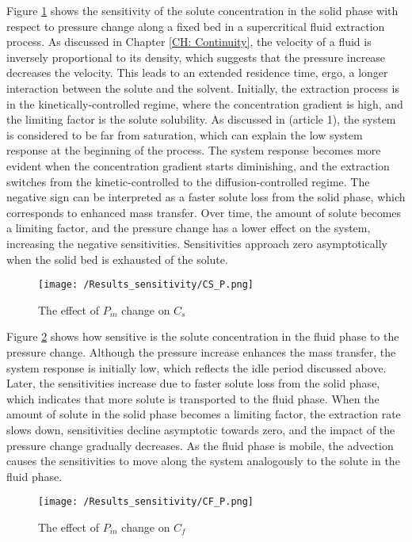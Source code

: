 \documentclass[../Article_Sensitivity_Analsysis.tex]{subfiles}
\begin{document}
	Figure \ref{fig:Sensitivty_P_CS} shows the sensitivity of the solute concentration in the solid phase with respect to pressure change along a fixed bed in a supercritical fluid extraction process. As discussed in Chapter \ref{CH: Continuity}, the velocity of a fluid is inversely proportional to its density, which suggests that the pressure increase decreases the velocity. This leads to an extended residence time, ergo, a longer interaction between the solute and the solvent. Initially, the extraction process is in the kinetically-controlled regime, where the concentration gradient is high, and the limiting factor is the solute solubility. As discussed in ({\color{red}article 1}), the system is considered to be far from saturation, which can explain the low system response at the beginning of the process. The system response becomes more evident when the concentration gradient starts diminishing, and the extraction switches from the kinetic-controlled to the diffusion-controlled regime. The negative sign can be interpreted as a faster solute loss from the solid phase, which corresponds to enhanced mass transfer. Over time, the amount of solute becomes a limiting factor, and the pressure change has a lower effect on the system, increasing the negative sensitivities. Sensitivities approach zero asymptotically when the solid bed is exhausted of the solute.

	\begin{figure}[!ht]
		\centering
		\texttt{[image: /Results\_sensitivity/CS\_P.png]}
		\caption{The effect of $P_{in}$ change on $C_s$}
		\label{fig:Sensitivty_P_CS}
	\end{figure}
	
	Figure \ref{fig:Sensitivty_P_CF} shows how sensitive is the solute concentration in the fluid phase to the pressure change. Although the pressure increase enhances the mass transfer, the system response is initially low, which reflects the idle period discussed above. Later, the sensitivities increase due to faster solute loss from the solid phase, which indicates that more solute is transported to the fluid phase. When the amount of solute in the solid phase becomes a limiting factor, the extraction rate slows down, sensitivities decline asymptotic towards zero, and the impact of the pressure change gradually decreases. As the fluid phase is mobile, the advection causes the sensitivities to move along the system analogously to the solute in the fluid phase.
	
	\begin{figure}[!ht]
		\centering
		\texttt{[image: /Results\_sensitivity/CF\_P.png]}
		\caption{The effect of $P_{in}$ change on $C_f$}
		\label{fig:Sensitivty_P_CF}
	\end{figure}
	
\end{document}
